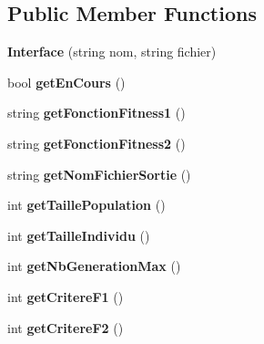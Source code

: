 \subsection*{Public Member Functions}
\begin{DoxyCompactItemize}
\item 
\mbox{\label{class_interface_a46c787075e2d259802c969d3b9013ed7}} 
{\bfseries Interface} (string nom, string fichier)
\item 
\mbox{\label{class_interface_ad3977dada600c42be3b8e0d3471e29d4}} 
bool {\bfseries get\+En\+Cours} ()
\item 
\mbox{\label{class_interface_aa4646dc20dc1a4405483019aba42aec2}} 
string {\bfseries get\+Fonction\+Fitness1} ()
\item 
\mbox{\label{class_interface_a15a03e2a28e7149f8393c03e88443764}} 
string {\bfseries get\+Fonction\+Fitness2} ()
\item 
\mbox{\label{class_interface_a2e023045d94fabb2ee950fad65feafc5}} 
string {\bfseries get\+Nom\+Fichier\+Sortie} ()
\item 
\mbox{\label{class_interface_a6e373414a358bf46b21d3d3f4c10ed57}} 
int {\bfseries get\+Taille\+Population} ()
\item 
\mbox{\label{class_interface_a483cd79ced3669461f96739afecebad0}} 
int {\bfseries get\+Taille\+Individu} ()
\item 
\mbox{\label{class_interface_ad8bcb596fca8a32b843aaff0c1fdc149}} 
int {\bfseries get\+Nb\+Generation\+Max} ()
\item 
\mbox{\label{class_interface_a78a4744acdf653668872c67d837edab2}} 
int {\bfseries get\+Critere\+F1} ()
\item 
\mbox{\label{class_interface_a145689cdf027cfa6ceda126bac0b5d1c}} 
int {\bfseries get\+Critere\+F2} ()
\item 
\mbox{\label{class_interface_ad265a27382bfa3b40fdae40f5344bf64}} 

\end{DoxyCompactItemize}
